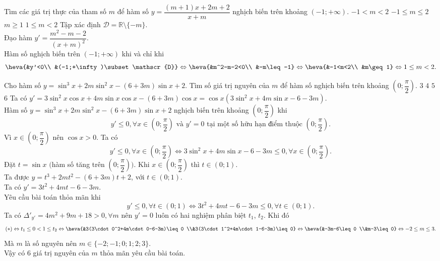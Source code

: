 \begin{ex}%
 Tìm các giá trị thực của tham số $m$ để hàm số $y=\dfrac{(m+1)x+2m+2}{x+m}$ nghịch biến trên khoảng $(-1;+\infty)$.
 \choice
  {$-1<m<2$}
  {$-1\leq m\leq 2$}
  {$m\geq 1$}
  {\True $1\leq m< 2$}
 \loigiai
  {
  Tập xác định $\mathscr{D}=\mathbb{R}\setminus\{-m\}$.\\
  Đạo hàm $y'=\dfrac{m^2-m-2}{(x+m)^2}$.\\
  Hàm số nghịch biến trên $(-1;+\infty)$ khi và chỉ khi
  \[\heva{&y'<0\\ &(-1;+\infty)\subset \mathscr{D}}\Leftrightarrow \heva{&m^2-m-2<0\\ &-m\leq -1}\Leftrightarrow\heva{&-1<m<2\\ &m\geq 1}\Leftrightarrow 1\leq m<2.\]
  }
\end{ex}

\begin{ex}%
 Cho hàm số $y=\sin^3x+2m\sin^2x-(6+3m)\sin x+2$. Tìm số giá trị nguyên của $m$ để hàm số nghịch biến trên khoảng $\left(0;\dfrac{\pi}{2}\right)$.
 \choice
  {$3$}
  {$4$}
  {$5$}
  {\True $6$}
 \loigiai
  {
  Ta có $y'=3\sin^2 x\cos x+4m\sin x\cos x-(6+3m)\cos x = \cos x\left(3\sin^2 x+4m\sin x-6-3m\right)$.\\
  Hàm số $y=\sin^3x+2m\sin^2x-(6+3m)\sin x+2$ nghịch biến trên khoảng $\left(0;\dfrac{\pi}{2}\right)$ khi
  \[y'\leq 0, \forall x\in \left(0;\dfrac{\pi}{2}\right) \text{ và } y'=0 \text{ tại một số hữu hạn điểm thuộc } \left(0;\dfrac{\pi}{2}\right).\]
  Vì $x\in \left(0;\dfrac{\pi}{2}\right)$ nên $\cos x>0$. Ta có 
  \[y'\leq 0, \forall x\in \left(0;\dfrac{\pi}{2}\right) \Leftrightarrow 3\sin^2x+4m\sin x-6-3m\leq 0, \forall x\in \left(0;\dfrac{\pi}{2}\right).\]
  Đặt $t=\sin x$ $\Big($hàm số tăng trên $\left(0;\dfrac{\pi}{2}\right)\Big)$. Khi $x\in \left(0;\dfrac{\pi}{2}\right)$ thì $t\in(0;1)$.\\
  Ta được $y=t^3+2mt^2-(6+3m)t+2$, với $t\in(0;1)$.\\
  Ta có $y'=3t^2+4mt-6-3m$.\\
  Yêu cầu bài toán thỏa mãn khi
  \[y'\leq 0, \forall t\in(0;1) \Leftrightarrow 3t^2+4mt-6-3m\leq 0, \forall t\in(0;1).\tag{$*$}\]
  Ta có $\Delta'_{y'}=4m^2+9m+18>0,\forall m$ nên $y'=0$ luôn có hai nghiệm phân biệt $t_1$, $t_2$. Khi đó
  \[(*)\Leftrightarrow t_1\leq 0<1\leq t_2 \Leftrightarrow \heva{&3(3\cdot 0^2+4m\cdot 0-6-3m)\leq 0 \\&3(3\cdot 1^2+4m\cdot 1-6-3m)\leq 0} \Leftrightarrow \heva{&-3m-6\leq 0 \\&m-3\leq 0} \Leftrightarrow -2\leq m\leq 3.\]
  Mà $m$ là số nguyên nên $m\in\{-2;-1;0;1;2;3\}$.\\
  Vậy có $6$ giá trị nguyên của $m$ thỏa mãn yêu cầu bài toán.
  }
\end{ex}

